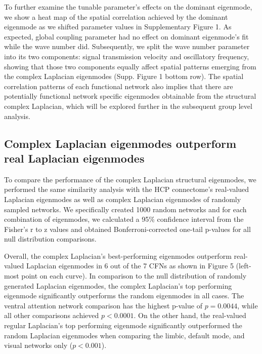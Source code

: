 \documentclass{article}
\begin{document}
To further examine the tunable parameter's effects on the dominant eigenmode, we show a heat map of the spatial correlation achieved by the dominant eigenmode as we shifted parameter values in Supplementary Figure 1. As expected, global coupling parameter had no effect on dominant eigenmode's fit while the wave number did. Subsequently, we split the wave number parameter into its two components: signal transmission velocity and oscillatory frequency, showing that those two components equally affect spatial patterns emerging from the complex Laplacian eigenmodes (Supp. Figure 1 bottom row). The spatial correlation patterns of each functional network also implies that there are potentially functional network specific eigenmodes obtainable from the structural complex Laplacian, which will be explored further in the subsequent group level analysis.

\subsection{Complex Laplacian eigenmodes outperform real Laplacian eigenmodes}
To compare the performance of the complex Laplacian structural eigenmodes, we performed the same similarity analysis with the HCP connectome's real-valued Laplacian eigenmodes as well as complex Laplacian eigenmodes of randomly sampled networks. We specifically created 1000 random networks and for each combination of eigenmodes, we calculated a 95\% confidence interval from the Fisher's r to z values and obtained Bonferroni-corrected one-tail p-values for all null distribution comparisons.

Overall, the complex Laplacian's best-performing eigenmodes outperform real-valued Laplacian eigenmodes in 6 out of the 7 CFNs as shown in Figure 5 (left-most point on each curve). In comparison to the null distribution of randomly generated Laplacian eigenmodes, the complex Laplacian's top performing eigenmode significantly outperforms the random eigenmodes in all cases. The ventral attention network comparison has the highest p-value of $p=0.0044$, while all other comparisons achieved $p< 0.0001$. On the other hand, the real-valued regular Laplacian's top performing eigenmode significantly outperformed the random Laplacian eigenmodes when comparing the limbic, default mode, and visual networks only ($p<0.001$).
\end{document}
